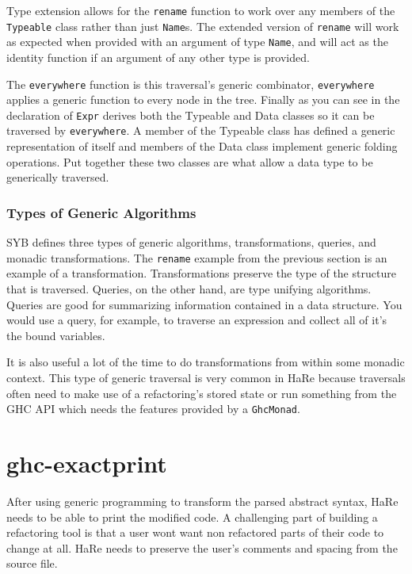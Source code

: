 	Type extension allows for the \texttt{rename} function to work over any members of the \texttt{Typeable} class rather than just \texttt{Name}s. The extended version of \texttt{rename} will work as expected when provided with an argument of type \texttt{Name}, and will act as the identity function if an argument of any other type is provided.
	
	The \texttt{everywhere} function is this traversal's generic combinator, \texttt{everywhere} applies a generic function to every node in the tree. Finally as you can see in the declaration of \texttt{Expr} derives both the Typeable and Data classes so it can be traversed by \texttt{everywhere}. A member of the Typeable class has defined a generic representation of itself and members of the Data class implement generic folding operations. Put together these two classes are what allow a data type to be generically traversed. 
	
\subsubsection{Types of Generic Algorithms}

SYB defines three types of generic algorithms, transformations, queries, and monadic transformations. The \texttt{rename} example from the previous section is an example of a transformation. Transformations preserve the type of the structure that is traversed. Queries, on the other hand, are type unifying algorithms. Queries are good for summarizing information contained in a data structure. You would use a query, for example, to traverse an expression and collect all of it's the bound variables.

It is also useful a lot of the time to do transformations from within some monadic context. This type of generic traversal is very common in HaRe because traversals often need to make use of a refactoring's stored state or run something from the GHC API which needs the features provided by a \texttt{GhcMonad}.  
	 
\section{ghc-exactprint}

After using generic programming to transform the parsed abstract syntax, HaRe needs to be able to print the modified code. A challenging part of building a refactoring tool is that a user wont want non refactored parts of their code to change at all. HaRe needs to preserve the user's comments and spacing from the source file.

